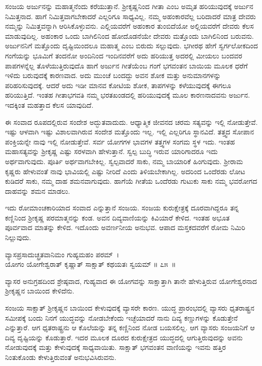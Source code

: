 ಸಂಜಯ ಅರ್ಜುನನ್ನು ಮಹಾತ್ಮನೆಂದು ಕರೆಯುತ್ತಾನೆ. ಶ‍್ರೀಕೃಷ್ಣನಿಂದ ಗೀತಾ ಎಂಬ ಅಮೃತ ಹರಿಯುವುದಕ್ಕೆ ಅರ್ಜುನ ನಿಮಿತ್ತನಾದ. ಹಾಗೆ ನಿಮಿತ್ತವಾಗಬೇಕಾದರೆ ಎಲ್ಲರಿಗೂ ಸಾಧ್ಯವಿಲ್ಲ. ನಮ್ಮ ಅಹಂಕಾರವೆಲ್ಲ ಬರಿದಾದರೆ ಮಾತ್ರ ದೇವರು ನಮ್ಮನ್ನು ನಿಮಿತ್ತವನ್ನಾಗಿ ಆರಿಸಿಕೊಳ್ಳುವನು. ಎಲ್ಲಿಯವರೆಗೆ ಅಹಂಕಾರ ತುಂಬಿದೆಯೋ ಅಲ್ಲಿಯವರೆಗೆ ದೇವರು ಕೆಲಸ ಮಾಡುವುದಿಲ್ಲ. ಅಹಂಕಾರ ಒಂದು ಬಾಗಿಲಿನಿಂದ ಹೋದೊಡನೆಯೇ ದೇವರು ಮತ್ತೊಂದು ಬಾಗಿಲಿನಿಂದ ಬರುವನು. ಅರ್ಜುನನಿಗೆ ಮತ್ತೊಂದು ದೃಷ್ಟಿಯಿಂದಲೂ ಮಹಾತ್ಮ ಎಂಬ ಬಿರುದು ಸಲ್ಲುವುದು. ಭಗೀರಥ ಹೇಗೆ ಸ್ವರ್ಗಲೋಕದಿಂದ ಗಂಗೆಯನ್ನು ಭೂಮಿಗೆ ತಂದನೋ ಅಂದಿನಿಂದ ಇಂದಿನವರೆಗೆ ಅದು ಹರಿಯುತ್ತ ಅದರಲ್ಲಿ ಮೀಯಲು ಬಂದವರ ಪಾಪಗಳನ್ನೆಲ್ಲ ತೊಳೆಯುತ್ತಿರುವುದೊ ಹಾಗೆ ಅರ್ಜುನ ಗೀತೆಯೆಂಬ ಗಂಗೆ ಭಗವಂತನ ಬಾಯಿಯ ಮೂಲಕ ಧರೆಗೆ ಇಳಿದು ಬರುವುದಕ್ಕೆ ಕಾರಣವಾದ. ಅದು ಮುಂಚೆ ಬಂದದ್ದು ಅವನ ಶೋಕ ಮತ್ತು ಅನುಮಾನಗಳನ್ನು ಪರಿಹರಿಸುವುದಕ್ಕೆ. ಆದರೆ ಅದು ಇಡೀ ಮಾನವ ಕೋಟಿಯ ಶೋಕ, ತಾಪಗಳನ್ನು ಕಳೆಯುವುದಕ್ಕೆ ಈಗಲೂ ಹರಿಯುತ್ತಿದೆ. ಇಂತಹ ಗೀತಾಭಗವತಿ ನಮ್ಮ ಭರತಖಂಡದಲ್ಲಿ ಹರಿಯುವುದಕ್ಕೆ ಮೂಲ ಕಾರಣನಾದವನು ಅರ್ಜುನ. ಇದಕ್ಕಿಂತ ಮಹತ್ತಾದ ಕೆಲಸ ಯಾವುದಿದೆ.

ಈ ಸಂವಾದ ರೂಪದಲ್ಲಿರುವ ಸಂದೇಶ ಅದ್ಭುತವಾದುದು. ಆಧ್ಯಾತ್ಮಿಕ ಜೀವನದ ಚರಮ ಸತ್ಯವನ್ನು ಇಲ್ಲಿ ನೋಡುತ್ತೇವೆ. ಇಷ್ಟು ಆಳವಾಗಿ ಇಷ್ಟು ವಿಶಾಲವಾಗಿರುವ ಸಂದೇಶ ಮತ್ತೊಂದು ಇಲ್ಲ. ಇಲ್ಲಿ ಎಲ್ಲರಿಗೂ ಸ್ಥಾನವಿದೆ. ತತ್ತ್ವದ ಸೋಪಾನ ಪಂಕ್ತಿಯನ್ನೇ ನಾವು ಇಲ್ಲಿ ನೋಡುತ್ತೇವೆ. ಸರ್ವ ಯೋಗಗಳ ಭಾವಗಳ ತತ್ತ್ವಗಳ ಸಂಗಮ ಸ್ಥಳ ಇದು. ಇಂತಹ ಮಹಾಸತ್ಯವನ್ನು ಶ‍್ರೀಕೃಷ್ಣ ಎಷ್ಟು ಸರಳವಾಗಿ ಹೇಳುತ್ತಾನೆ. ಸ್ವಲ್ಪ ಬುದ್ಧಿ ಇರುವ ಯಾರಿಗಾದರೂ ಇದು ಅರ್ಥವಾಗುವುದು. ಪೂರ್ತಿ ಅರ್ಥವಾಗಬೇಕಿಲ್ಲ. ಸ್ವಲ್ಪವಾದರೆ ಸಾಕು, ನಮ್ಮ ಬಾಯಾರಿಕೆ ಹಿಂಗುವುದು. ಶ‍್ರೀರಾಮ ಕೃಷ್ಣರು ಹೇಳುವಂತೆ ನಾವು ಭಾವಿಯಲ್ಲಿ ಎಷ್ಟು ನೀರಿದೆ ಎಂದು ತಿಳಿಯಬೇಕಾಗಿಲ್ಲ. ಅದರಿಂದ ಒಂದೆರಡು ಲೋಟ ಕುಡಿದರೆ ಸಾಕು, ನಮ್ಮ ದಾಹ ಶಮನವಾಗುವುದು. ಹಾಗೆಯೆ ಗೀತೆಯ ಒಂದೆರಡು ಗುಟುಕು ಸಾಕು ನಮ್ಮ ಭವರೋಗದ ದಾಹವನ್ನು ಶಮನ ಮಾಡಲು.

ಇದು ರೋಮಾಂಚಕಾರಿಯಾದ ಸಂವಾದ ಎನ್ನುತ್ತಾನೆ ಸಂಜಯ. ಸಂಜಯ ಕುರುಕ್ಷೇತ್ರಕ್ಕೆ ದೂರವಾಗಿದ್ದರೂ ತನ್ನ ಕಣ್ಣಿನಿಂದ ಶ‍್ರೀಕೃಷ್ಣ ಪರಮಾತ್ಮನನ್ನು ಕಂಡ. ಅವನ ದಿವ್ಯವಾಣಿಯನ್ನು ಕಿವಿಯಾರೆ ಕೇಳಿದ. ಇಂತಹ ಅಭೂತ ಪೂರ್ವವಾದ ಮಾತನ್ನು ಕೇಳಿದ. ಇದೊಂದು ಅವರ್ಣನೀಯ ಅನುಭವ. ಆಪಾದ ಮಸ್ತಕದವರೆಗೆ ರೋಮ ನಿಮಿರಿ ನಿಲ್ಲುವುದು.

\begin{shloka}
ವ್ಯಾಸಪ್ರಸಾದುಚ್ಛ್ರತವಾನಿಮಂ ಗುಹ್ಯಮಹಂ ಪರಮ್~।\\ಯೋಗಂ ಯೋಗೇಶ್ವರಾತ್ ಕೃಷ್ಣಾತ್ ಸಾಕ್ಷಾತ್ ಕಥಯತಃ ಸ್ವಯಮ್ \hfill॥ ೭೫~॥
\end{shloka}

\begin{artha}
ವ್ಯಾಸರ ಅನುಗ್ರಹದಿಂದ ಶ್ರೇಷ್ಠವಾದ, ಗುಹ್ಯವಾದ ಈ ಯೋಗವನ್ನು ಸಾಕ್ಷಾತ್ತಾಗಿ ತಾನೇ ಹೇಳು\-ತ್ತಿರುವ ಯೋಗೇಶ್ವರನಾದ ಶ‍್ರೀಕೃಷ್ಣನ ಬಾಯಿಂದ ಕೇಳಿದೆನು.
\end{artha}

ಸಂಜಯ ಸಾಕ್ಷಾತ್ ಶ‍್ರೀಕೃಷ್ಣನ ಬಾಯಿಂದ ಕೇಳುವುದಕ್ಕೆ ವ್ಯಾಸರೇ ಕಾರಣ. ಯುದ್ಧ ಪ್ರಾರಂಭದಲ್ಲಿ ವ್ಯಾಸರು ಧೃತರಾಷ್ಟ್ರನ ಸಮೀಪಕ್ಕೆ ಬಂದು ನಿನಗೆ ಯುದ್ಧವನ್ನು ನೋಡಬೇಕೆಂದು ಇಚ್ಛೆಯಾದರೆ ನಾನು ದಿವ್ಯ ಕಣ್ಣುಗಳನ್ನು ಕೊಡುತ್ತೇನೆ ಎನ್ನುತ್ತಾರೆ. ಆಗ ಧೃತರಾಷ್ಟ್ರನು ಆ ಕೊಲೆಯನ್ನು ತನ್ನ ಕಣ್ಣಿನಿಂದ ನೋಡ ಬಯಸಲಿಲ್ಲ. ಆಗ ವ್ಯಾಸರು ಸಂಜಯನಿಗೆ ಆ ದಿವ್ಯ ದೃಷ್ಟಿಯನ್ನು ಕೊಡುತ್ತಾರೆ. ಇದರ ಮೂಲಕ ದೂರದ ಕುರುಕ್ಷೇತ್ರದ ಯುದ್ಧದಲ್ಲಿ ಆಗುತ್ತಿರುವುದನ್ನು ಅವನು ನೋಡುವುದಕ್ಕೆ ಮತ್ತು ಕೇಳುವುದಕ್ಕೆ ಸಾಧ್ಯವಾಯಿತು. ಸಾಕ್ಷಾತ್ ಭಗವಂತನ ವಾಣಿಯನ್ನು ಇವನು ಹತ್ತಿರ ನಿಂತುಕೊಂಡು ಕೇಳುತ್ತಿರುವಂತೆ ಅನುಭವಿಸಿರುವನು.

